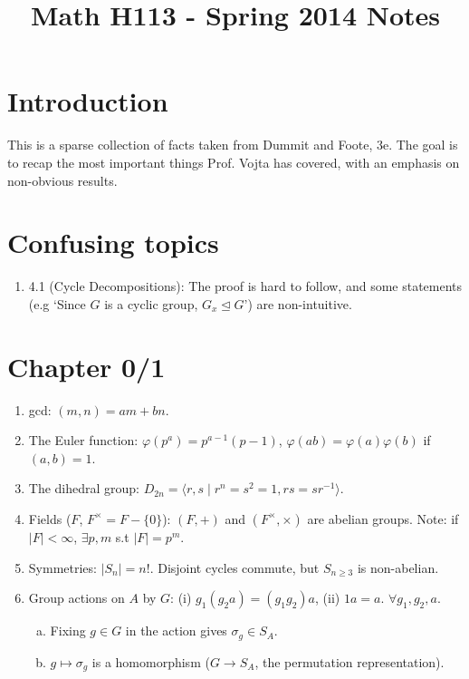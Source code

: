 \documentclass{article}
\title{Math H113 - Spring 2014 Notes}
\begin{document}
\maketitle

\section*{Introduction}

This is a sparse collection of facts taken from Dummit and Foote, 3e. The
goal is to recap the most important things Prof. Vojta has covered, with an
emphasis on non-obvious results.

\section*{Confusing topics}

\begin{enumerate}[1.]
    \item 4.1 (Cycle Decompositions): The proof is hard to follow, and some
        statements (e.g `Since $G$ is a cyclic group, $G_x \trianglelefteq
        G$') are non-intuitive.
\end{enumerate}

\section*{Chapter 0/1}

\begin{enumerate}[1.]
    \item gcd: $(m, n) = am + bn$. 
    \item The Euler function: $\varphi(p^a) = p^{a-1}(p - 1)$, $\varphi(ab)
        = \varphi(a)\varphi(b)$ if $(a, b) = 1$.
    \item The dihedral group: $D_{2n} = \langle r, s \mid r^n = s^2 = 1, rs
        = sr^{-1} \rangle$.
    \item Fields ($F$, $F^{\times} = F - \{0\}$): $(F, +)$ and $(F^{\times},
        \times)$ are abelian groups. Note: if $|F| < \infty$, $\exists p,m$
        s.t $|F| = p^m$.
    \item Symmetries: $|S_n| = n!$. Disjoint cycles commute, but $S_{n
        \geq 3}$ is non-abelian.
    \item Group actions on $A$ by $G$: (i) $g_1(g_2a) = (g_1g_2)a$, (ii) $1a
        = a$. $\forall g_1,g_2,a$.
        \begin{enumerate}[(a)]
            \item Fixing $g \in G$ in the action gives $\sigma_g \in S_A$.
            \item $g \mapsto \sigma_g$ is a homomorphism ($G \rightarrow
                S_A$, the permutation representation).
        \end{enumerate}
\end{enumerate}
\end{document}
